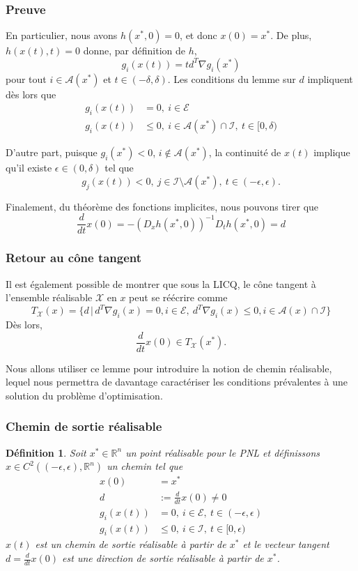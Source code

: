 \documentclass[usepdftitle=false,aspectratio=169]{beamer}
\newtheorem{defn}{Définition}
\def\red{\color{red}}
\def\cA{\mathcal{A}}
\def\cE{\mathcal{E}}
\def\cI{\mathcal{I}}
\def\cX{\mathcal{X}}
\def\RR{\mathbb{R}}
\begin{document}
\begin{frame}
\frametitle{Preuve}

En particulier, nous avons $h(x^*,0) = 0$, et donc $x(0) = x^*$.
De plus, $h(x(t), t) = 0$ donne, par définition de $h$,
$$
g_i(x(t)) = td^T \nabla g_i(x^*)
$$
pour tout $i \in \cA(x^*)$ et $t \in (-\delta, \delta)$.
Les conditions du lemme sur $d$ impliquent dès lors que
\begin{align*}
g_i(x(t)) &= 0,\ i \in \cE \\
g_i(x(t)) &\leq 0,\ i \in \cA(x^*) \cap \cI,\ t \in [0,\delta)
\end{align*}

D'autre part, puisque $g_i(x^*) < 0$, $i \notin \cA(x^*)$, la continuité de $x(t)$ implique qu'il existe $\epsilon \in (0,\delta)$ tel que
$$
g_j(x(t)) < 0,\ j \in \cI \setminus \cA(x^*),\ t \in (-\epsilon, \epsilon).
$$

Finalement, du théorème des fonctions implicites, nous pouvons tirer que
$$
\frac{d}{dt} x(0) = -(D_x h(x^*, 0))^{-1} D_th(x^*, 0) = d
$$

\end{frame}

\begin{frame}
\frametitle{Retour au cône tangent}

Il est également possible de montrer que sous la LICQ, le cône tangent à l'ensemble réalisable $\cX$ en $x$ peut se réécrire comme
$$
T_{\cX}(x) = \{ d \,|\, d^T\nabla g_i(x) = 0, i \in \cE, \ d^T\nabla g_i(x) \leq 0, i \in \cA(x) \cap \cI \}
$$
Dès lors,
$$
\frac{d}{dt} x(0) \in T_{\cX}(x^*).
$$

\mbox{}

Nous allons utiliser ce lemme pour introduire la notion de chemin réalisable, lequel nous permettra de davantage caractériser les conditions prévalentes à une solution du problème d'optimisation.

\end{frame}

\begin{frame}
	\frametitle{Chemin de sortie réalisable}
	
	\begin{defn}
		Soit $x^* \in \RR^n$ un point réalisable pour le PNL et définissons $x \in C^2\left((-\epsilon,\epsilon), \RR^n \right)$ un chemin tel que
		\begin{align*}
		x(0) &= x^* \\
		d &:= \frac{d}{dt}x(0) \ne 0 \\
		g_i(x(t)) &= 0,\ i \in \cE,\ t \in (-\epsilon, \epsilon) \\
		g_i(x(t)) &\leq 0,\ i \in \cI,\ t \in [0, \epsilon)
		\end{align*}
		$x(t)$ est {\red un chemin de sortie réalisable} à partir de $x^*$ et le vecteur tangent $d = \frac{d}{dt}x(0)$ est {\red une direction de sortie réalisable} à partir de $x^*$.
	\end{defn}

\end{frame}
\end{document}
